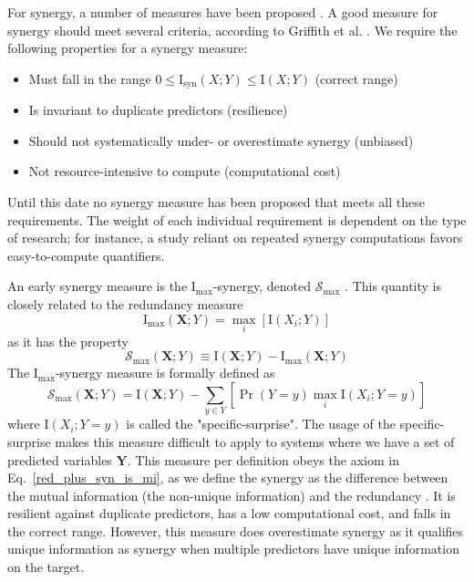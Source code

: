 \documentclass[../main.tex]{subfiles}
\begin{document}
For synergy, a number of measures have been proposed \cite{griffith2014quantifying, olbrich2015information}.
A good measure for synergy should meet several criteria, according to Griffith et al. \cite{griffith2014quantifying}.
We require the following properties for a synergy measure:
%
\begin{itemize}
\item Must fall in the range $0 \le \mathrm{I}_\mathrm{syn}\left( X;Y \right) \le \mathrm{I} \left( X;Y \right)$ (correct range)
\item Is invariant to duplicate predictors (resilience)
\item Should not systematically under- or overestimate synergy (unbiased)
\item Not resource-intensive to compute (computational cost)
\end{itemize}
%
Until this date no synergy measure has been proposed that meets all these requirements.
The weight of each individual requirement is dependent on the type of research; for instance, a study reliant on repeated synergy computations favors easy-to-compute quantifiers.

An early synergy measure is the $\mathrm{I}_\mathrm{max}$-synergy, denoted $\mathcal{S}_\mathrm{max}$ \cite{williams2010nonnegative}.
This quantity is closely related to the redundancy measure
%
\begin{equation}
\mathrm{I}_\mathrm{max} \left( \mathbf{X};Y \right) = \max_i [\mathrm{I} \left( X_{i};Y \right)]
\end{equation}
%
as it has the property
%
\begin{equation}
\mathcal{S}_\mathrm{max} \left( \mathbf{X};Y \right) \equiv \mathrm{I} \left( \mathbf{X};Y \right) - \mathrm{I}_\mathrm{max} \left( \mathbf{X};Y \right)
\end{equation}
%
The $\mathrm{I}_\mathrm{max}$-synergy measure is formally defined as
%
\begin{equation}
\mathcal{S}_\mathrm{max} \left( \mathbf{X};Y \right) = \mathrm{I} \left( \mathbf{X};Y \right) - \sum_{y \in Y} [ \Pr \left( Y = y \right) \max_i \mathrm{I} \left( X_i ; Y = y \right) ]
\end{equation}
%
where $\mathrm{I} \left( X_i ; Y = y \right)$ is called the "specific-surprise".
The usage of the specific-surprise makes this measure difficult to apply to systems where we have a set of predicted variables $\mathbf{Y}$.
This measure per definition obeys the axiom in Eq.~\ref{red_plus_syn_is_mi}, as we define the synergy as the difference between the mutual information (the non-unique information) and the redundancy \cite{griffith2014quantifying}.
It is resilient against duplicate predictors, has a low computational cost, and falls in the correct range.
However, this measure does overestimate synergy as it qualifies unique information as synergy when multiple predictors have unique information on the target.
\end{document}
